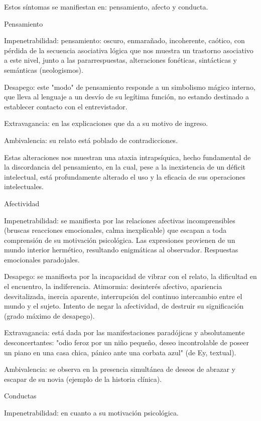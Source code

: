 \documentclass[encares.tex]{subfiles}
\begin{document}
Estos síntomas se manifiestan en: pensamiento, afecto y conducta.

Pensamiento

Impenetrabilidad: pensamiento: oscuro, enmarañado, incoherente, caótico, con pérdida de la secuencia asociativa lógica que nos muestra un trastorno asociativo a este nivel, junto a las pararrespuestas, alteraciones fonéticas, sintácticas y semánticas (neologismos).

Desapego: este "modo" de pensamiento responde a un simbolismo mágico interno, que lleva al lenguaje a un desvío de su legítima función, no estando destinado a establecer contacto con el entrevistador.

Extravagancia: en las explicaciones que da a su motivo de ingreso.

Ambivalencia: su relato está poblado de contradicciones.

Estas alteraciones nos muestran una ataxia intrapsíquica, hecho fundamental de la discordancia del pensamiento, en la cual, pese a la inexistencia de un déficit intelectual, está profundamente alterado el uso y la eficacia de sus operaciones intelectuales.

Afectividad

Impenetrabilidad: se manifiesta por las relaciones afectivas incomprensibles (bruscas reacciones emocionales, calma inexplicable) que escapan a toda comprensión de su motivación psicológica. Las expresiones provienen de un mundo interior hermético, resultando enigmáticas al observador. Respuestas emocionales paradojales.

Desapego: se manifiesta por la incapacidad de vibrar con el relato, la dificultad en el encuentro, la indiferencia. Atimormia: desinterés afectivo, apariencia desvitalizada, inercia aparente, interrupción del continuo intercambio entre el mundo y el sujeto. Intento de negar la afectividad, de destruir su significación (grado máximo de desapego).

Extravagancia: está dada por las manifestaciones paradójicas y absolutamente desconcertantes: "odio feroz por un niño pequeño, deseo incontrolable de poseer un piano en una casa chica, pánico ante una corbata azul" (de Ey, textual).

Ambivalencia: se observa en la presencia simultánea de deseos de abrazar y escapar de su novia (ejemplo de la historia clínica).

Conductas

Impenetrabilidad: en cuanto a su motivación psicológica.
\end{document}
